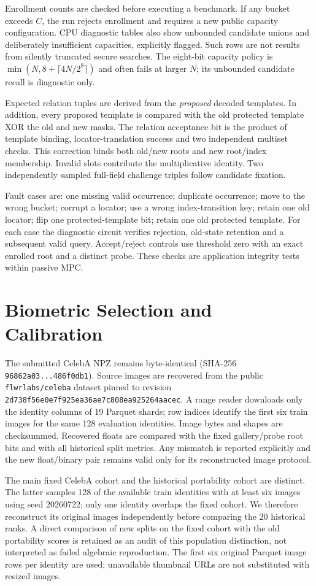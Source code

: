 \documentclass[journal,onecolumn]{IEEEtran}
\begin{document}
Enrollment counts are checked before executing a benchmark. If any bucket exceeds $C$, the run rejects enrollment and requires a new public capacity configuration. CPU diagnostic tables also show unbounded candidate unions and deliberately insufficient capacities, explicitly flagged. Such rows are not results from silently truncated secure searches. The eight-bit capacity policy is $\min(N,8+\lceil4N/2^8\rceil)$ and often fails at larger $N$; its unbounded candidate recall is diagnostic only.

Expected relation tuples are derived from the \emph{proposed} decoded templates. In addition, every proposed template is compared with the old protected template XOR the old and new masks. The relation acceptance bit is the product of template binding, locator-translation success and two independent multiset checks. This correction binds both old/new roots and new root/index membership. Invalid slots contribute the multiplicative identity. Two independently sampled full-field challenge triples follow candidate fixation.

Fault cases are: one missing valid occurrence; duplicate occurrence; move to the wrong bucket; corrupt a locator; use a wrong index-transition key; retain one old locator; flip one protected-template bit; retain one old protected template. For each case the diagnostic circuit verifies rejection, old-state retention and a subsequent valid query. Accept/reject controls use threshold zero with an exact enrolled root and a distinct probe. These checks are application integrity tests within passive MPC.

\section{Biometric Selection and Calibration}
The submitted CelebA NPZ remains byte-identical (SHA-256 \texttt{96862a03...486f0db1}). Source images are recovered from the public \texttt{flwrlabs/celeba} dataset pinned to revision \texttt{2d738f56e0e7f925ea36ae7c808ea925264aacec}. A range reader downloads only the identity columns of 19 Parquet shards; row indices identify the first six train images for the same 128 evaluation identities. Image bytes and shapes are checksummed. Recovered floats are compared with the fixed gallery/probe root bits and with all historical split metrics. Any mismatch is reported explicitly and the new float/binary pair remains valid only for its reconstructed image protocol.

The main fixed CelebA cohort and the historical portability cohort are distinct. The latter samples 128 of the available train identities with at least six images using seed 20260722; only one identity overlaps the fixed cohort. We therefore reconstruct its original images independently before comparing the 20 historical ranks. A direct comparison of new splits on the fixed cohort with the old portability scores is retained as an audit of this population distinction, not interpreted as failed algebraic reproduction. The first six original Parquet image rows per identity are used; unavailable thumbnail URLs are not substituted with resized images.
\end{document}
